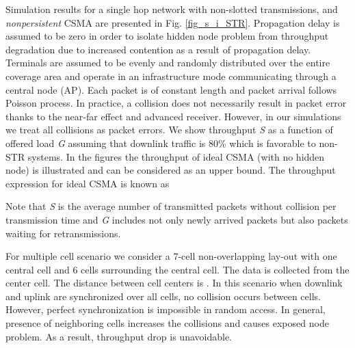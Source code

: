 \documentclass[twocolumn]{IEEEtran}
\begin{document}
Simulation results for a single hop network with non-slotted
transmissions, and \textit{nonpersistent} CSMA \cite{csma} are
presented in Fig. \ref{fig_s_i_STR}. Propagation delay is assumed to
be zero in order to isolate hidden node problem from throughput
degradation due to increased contention as a result of propagation
delay. Terminals are assumed to be evenly and randomly distributed
over the entire coverage area and operate in an infrastructure mode
communicating through a central node (AP). Each packet is of
constant length and packet arrival follows Poisson process. In
practice, a collision does not necessarily result in packet error
thanks to the near-far effect and advanced receiver. However, in our
simulations we treat all collisions as packet errors. We show
throughput \textit{S} as a function of offered load \textit{G}
assuming that downlink traffic is 80\% which is favorable to non-STR
systems. In the figures the throughput of ideal CSMA (with no hidden
node) is illustrated and can be considered as an upper bound. The
throughput expression for ideal CSMA is known as

Note that \textit{S} is the average number of transmitted packets
without collision per transmission time and \textit{G} includes not
only newly arrived packets but also packets waiting for
retransmissions.

For multiple cell scenario we consider a 7-cell non-overlapping
lay-out with one central cell and 6 cells surrounding the central
cell. The data is collected from the center cell. The distance
between cell centers is . In this scenario when downlink and
uplink are synchronized over all cells, no collision occurs between
cells. However, perfect synchronization is impossible in random
access. In general, presence of neighboring cells increases the
collisions and causes exposed node problem. As a result, throughput
drop is unavoidable.
\end{document}
